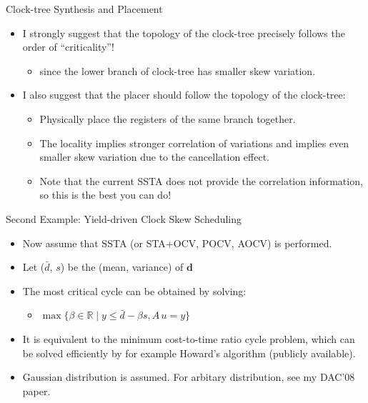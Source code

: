 \documentclass[10pt,ignorenonframetext,mathserif,onlymath]{beamer}
\providecommand{\tightlist}{%
  \setlength{\itemsep}{0pt}\setlength{\parskip}{0pt}}
\begin{document}
\begin{frame}{Clock-tree Synthesis and Placement}
\protect\hypertarget{clock-tree-synthesis-and-placement}{}

\begin{itemize}
\tightlist
\item
  I strongly suggest that the topology of the clock-tree precisely
  follows the order of “criticality”!

  \begin{itemize}
  \tightlist
  \item
    since the lower branch of clock-tree has smaller skew variation.
  \end{itemize}
\item
  I also suggest that the placer should follow the topology of the
  clock-tree:

  \begin{itemize}
  \tightlist
  \item
    Physically place the registers of the same branch together.
  \item
    The locality implies stronger correlation of variations and implies
    even smaller skew variation due to the cancellation effect.
  \item
    Note that the current SSTA does not provide the correlation
    information, so this is the best you can do!
  \end{itemize}
\end{itemize}

\end{frame}

\begin{frame}{Second Example: Yield-driven Clock Skew Scheduling}
\protect\hypertarget{second-example-yield-driven-clock-skew-scheduling}{}

\begin{itemize}
\tightlist
\item
  Now assume that SSTA (or STA+OCV, POCV, AOCV) is performed.
\item
  Let (\(\bar{d}\), \(s\)) be the (mean, variance) of \(\mathbf{d}\)
\item
  The most critical cycle can be obtained by solving:

  \begin{itemize}
  \tightlist
  \item
    \(\max\{\beta \in \mathbb{R} \mid y \leq \bar{d} - \beta s, A\,u = y\}\)
  \end{itemize}
\item
  It is equivalent to the minimum cost-to-time ratio cycle problem,
  which can be solved efficiently by for example Howard’s algorithm
  (publicly available).
\item
  Gaussian distribution is assumed. For arbitary distribution, see my
  DAC’08 paper.
\end{itemize}

\end{frame}
\end{document}
